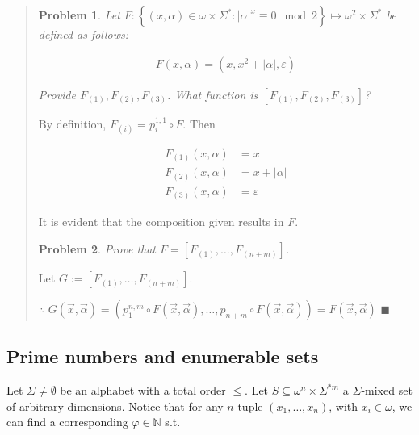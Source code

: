 \documentclass[a4paper, 12pt]{article}
\newtheorem{problem}{Problem}
\newtheorem{problem}{Problem}
\begin{document}
\small
\begin{quote}

\begin{problem}
    Let $F : \left\{ (x, \alpha) \in  \omega \times \Sigma^{*} : |\alpha|^x
        \equiv 0 \mod 2
    \right\} \mapsto \omega^2 \times \Sigma^{*}$ be defined as follows: 

    \begin{align*}
        F(x, \alpha) = (x, x^2 + |\alpha|, \varepsilon)
    \end{align*}

    Provide $F_{(1)}, F_{(2)}, F_{(3)}$. What function is $[F_{(1)}, F_{(2)},
    F_{(3)}]$?
\end{problem}

By definition, $F_{(i)} = p_i^{1, 1} \circ F$. Then 

\begin{align*}
    F_{(1)}(x, \alpha) &= x \\
    F_{(2)}(x, \alpha) &= x + |\alpha| \\
    F_{(3)}(x, \alpha) &= \varepsilon
\end{align*}

It is evident that the composition given results in $F$.

\begin{problem}
    Prove that $F = \left[ F_{(1)}, \ldots, F_{(n + m)} \right] $.
\end{problem}

Let $G := \left[ F_{(1)}, \ldots, F_{(n+m)} \right] $. 

$\therefore $  $G(\vec{x}, \vec{\alpha}) = \left( p_1^{n, m} \circ F(\vec{x},
\vec{\alpha}), \ldots, p_{n+m} \circ F(\vec{x}, \vec{\alpha})   \right)  =
F(\vec{x}, \vec{\alpha}) $ $\blacksquare$



\end{quote}
\normalsize



\subsection{Prime numbers and enumerable sets}

Let $\Sigma \neq \emptyset$ be an alphabet with a total order $\leq$. Let $S
\subseteq \omega^{n} \times \Sigma^{*m}$ a $\Sigma$-mixed set of arbitrary
dimensions. Notice that for any $n$-tuple $(x_1, \ldots, x_n)$, with $x_i \in
\omega$, we can find a corresponding $\varphi \in \mathbb{N}$ s.t. 
\end{document}
